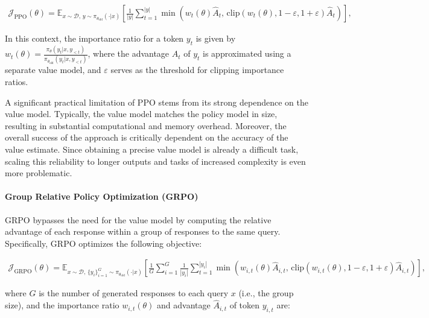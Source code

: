 \begin{align}
\mathcal{J}_\text{PPO}(\theta) = \mathbb{E}_{ x \sim \mathcal{D},\, y \sim \pi_{\theta_\text{old}}( \cdot | x) }
\left[ \frac{1}{|y|} \sum_{t=1}^{|y|} 
\min \left( w_{t}(\theta) \widehat{A}_{t},  \, \mathrm{clip} \left( w_{t}(\theta), 1 - {\varepsilon}, 1 + {\varepsilon}\right) \widehat{A}_{t} \right)
\right],
\end{align}

In this context, the importance ratio for a token $y_t$ is given by $
w_{t}(\theta) = \frac{ \pi_{\theta} (y_{t} | x, y_{<t}) }{ \pi_{\theta_\text{old}} (y_{t} | x,y_{<t})} $, where the advantage $\widehat{A}_{t}$ of $y_t$ is approximated using a separate value model, and $\varepsilon$ serves as the threshold for clipping importance ratios.

A significant practical limitation of PPO stems from its strong dependence on the value model. Typically, the value model matches the policy model in size, resulting in substantial computational and memory overhead. Moreover, the overall success of the approach is critically dependent on the accuracy of the value estimate. Since obtaining a precise value model is already a difficult task, scaling this reliability to longer outputs and tasks of increased complexity is even more problematic.

\paragraph{Group Relative Policy Optimization (GRPO)} GRPO \citep{grpo} bypasses the need for the value model by computing the relative advantage of each response within a group of responses to the same query. Specifically, GRPO optimizes the following objective:

\begin{align}
\label{equ:grpo}
\mathcal{J}_\text{GRPO}(\theta) = \mathbb{E}_{ x \sim \mathcal{D},\, \{y_i\}_{i=1}^G \sim \pi_{\theta_\text{old}}( \cdot | x) }
\left[ \frac{1}{G} \sum_{i=1}^{G} \frac{1}{|y_i|} \sum_{t=1}^{|y_i|} 
\min \left( w_{i,t}(\theta) \widehat{A}_{i,t},  \, \mathrm{clip} \left( w_{i,t}(\theta), 1 - {\varepsilon}, 1 + {\varepsilon}\right) \widehat{A}_{i,t} \right)
\right],
\end{align}

where $G$ is the number of generated responses to each query $x$ (i.e., the group size), and the importance ratio $w_{i,t}(\theta)$ and advantage $\widehat{A}_{i,t}$ of token $y_{i,t}$ are:

